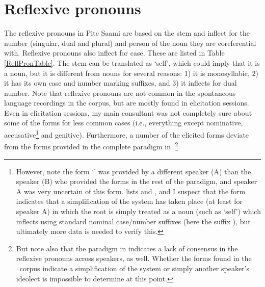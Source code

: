 
\FB



\section{Reflexive pronouns}\label{reflexivePronouns}
The reflexive pronouns in Pite Saami are based on the stem  and inflect for the number (singular, dual and plural) and person of the noun they are coreferential with. Reflexive pronouns also inflect for case. These are listed in Table \vref{ReflPronTable}. 
The stem  can be translated as ‘self’, which could imply that it is a noun, but it is different from nouns for several reasons: 1) it is monosyllabic, 2) it has its own case and number marking suffixes, and 3) it inflects for dual number. %
Note that reflexive pronouns are not common in the spontaneous language recordings in the corpus, but are mostly found in elicitation sessions. Even in elicitation sessions, my main consultant was not completely sure about some of the forms for less common cases (i.e., everything except nominative, accusative\footnote{However, note the form  ‘’ was provided by a different speaker (A) than the speaker (B) who provided the forms in the rest of the paradigm, and speaker A was very uncertain of this form. \citet[162]{Lehtiranta1992} lists  and , and I suspect that the form  indicates that a simplification of the system has taken place (at least for speaker A) in which the root  is simply treated as a noun (such as ‘self’) which inflects using standard nominal case/number suffixes (here the  suffix ), but ultimately more data is needed to verify this.} 
and genitive). Furthermore, a number of the elicited forms deviate from the forms provided in the complete paradigm in \citet[162]{Lehtiranta1992}.\footnote{But note also that the paradigm in \citet[162]{Lehtiranta1992} indicates a lack of consensus in the reflexive pronouns across speakers, as well. Whether the forms found in the \PSDP\ corpus indicate a simplification of the system or simply another speaker’s ideolect is impossible to determine at this point.}

